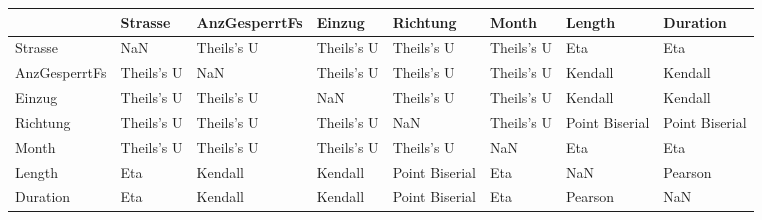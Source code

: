 \begin{tabular}{llllllll}
\toprule
{} &     Strasse & AnzGesperrtFs &      Einzug &        Richtung &       Month &          Length &        Duration \\
\midrule
Strasse       &         NaN &    Theils's U &  Theils's U &      Theils's U &  Theils's U &             Eta &             Eta \\
AnzGesperrtFs &  Theils's U &           NaN &  Theils's U &      Theils's U &  Theils's U &         Kendall &         Kendall \\
Einzug        &  Theils's U &    Theils's U &         NaN &      Theils's U &  Theils's U &         Kendall &         Kendall \\
Richtung      &  Theils's U &    Theils's U &  Theils's U &             NaN &  Theils's U &  Point Biserial &  Point Biserial \\
Month         &  Theils's U &    Theils's U &  Theils's U &      Theils's U &         NaN &             Eta &             Eta \\
Length        &         Eta &       Kendall &     Kendall &  Point Biserial &         Eta &             NaN &         Pearson \\
Duration      &         Eta &       Kendall &     Kendall &  Point Biserial &         Eta &         Pearson &             NaN \\
\bottomrule
\end{tabular}
